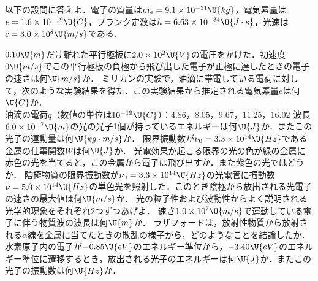 \filbreak
{}


\hspace{1zw}以下の設問に答えよ．電子の質量は$m_e=9.1\times 10^{-31}\U{kg}$，電気素量は$e=1.6\times 10^{-19}\U{C}$，プランク定数は$h=6.63\times 10^{-34}\U{J\cdot s}$，光速は$c=3.0\times 10^8\U{m/s}$である．
\begin{komon}
 $0.10\U{m}$だけ離れた平行極板に$2.0\times 10^2\U{V}$の電圧をかけた．初速度$0\U{m/s}$でこの平行極板の負極から飛び出した電子が正極に達したときの電子の速さは何$\U{m/s}$か．
 ミリカンの実験で，油滴に帯電している電荷に対して，次のような実験結果を得た．この実験結果から推定される電気素量$e$は何$\U{C}$か．\\
       \hspace*{2zw}油滴の電荷$q$（数値の単位は$10^{-19}\U{C}$）：$4.86$，$8.05$，$9.67$，$11.25$，$16.02$
 波長$6.0\times 10^{-7}\U{m}$の光の光子1個が持っているエネルギーは何$\U{J}$か．またこの光子の運動量は何$\U{kg\cdot m/s}$か．
 限界振動数が$\nu_0=3.3\times 10^{14}\U{Hz}$である金属の仕事関数$W$は何$\U{J}$か．
 光電効果が起こる限界の光の色が緑の金属に赤色の光を当てると，この金属から電子は飛び出すか．また紫色の光ではどうか．
 陰極物質の限界振動数が$\nu_0=3.3\times 10^{14}\U{Hz}$の光電管に振動数$\nu=5.0\times 10^{14}\U{Hz}$の単色光を照射した．このとき陰極から放出される光電子の速さの最大値は何$\U{m/s}$か．
 光の粒子性および波動性からよく説明される光学的現象をそれぞれ2つずつあげよ．
 速さ$1.0\times 10^7\U{m/s}$で運動している電子に伴う物質波の波長は何$\U{m}$か．
 ラザフォードは，放射性物質から放射される$\alpha$線を金属に当てたときの散乱の様子から，どのようなことを結論したか．
 水素原子内の電子が$-0.85\U{eV}$のエネルギー準位から，$-3.40\U{eV}$のエネルギー準位に遷移するとき，放出される光子のエネルギーは何$\U{J}$か．またこの光子の振動数は何$\U{Hz}$か．
\end{komon}

\filbreak
{}


